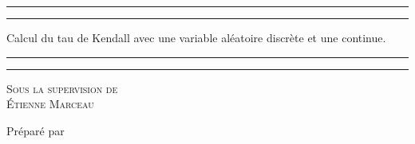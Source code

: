 \documentclass{article}
\begin{document}
	\renewcommand{\tablename}{Tableau}
	\renewcommand{\figurename}{Illustration}
	
	\begin{titlepage}
		\centering %
		
		\scshape %
		
		\vspace*{7\baselineskip} %
		
		
		\rule{\textwidth}{1.6pt}\vspace*{-\baselineskip}\vspace*{2pt} %
		\rule{\textwidth}{0.4pt} %
		
		\vspace{0.75\baselineskip} %
		{\LARGE Calcul du tau de Kendall avec une variable aléatoire discrète et une continue. \\} %
		\vspace{0.75\baselineskip} %
		
		\rule{\textwidth}{0.4pt}\vspace*{-\baselineskip}\vspace{3.2pt} %
		\rule{\textwidth}{1.6pt} %
		
		\vspace{3\baselineskip} %
		
		{\scshape\Large Sous la supervision de \\Étienne Marceau\\} %
		
		\vspace*{3\baselineskip}
		
		
		\vspace*{3\baselineskip} %
		
		
		Préparé par
		
		\vspace{0.5\baselineskip} %
		

\end{titlepage}
\end{document}
